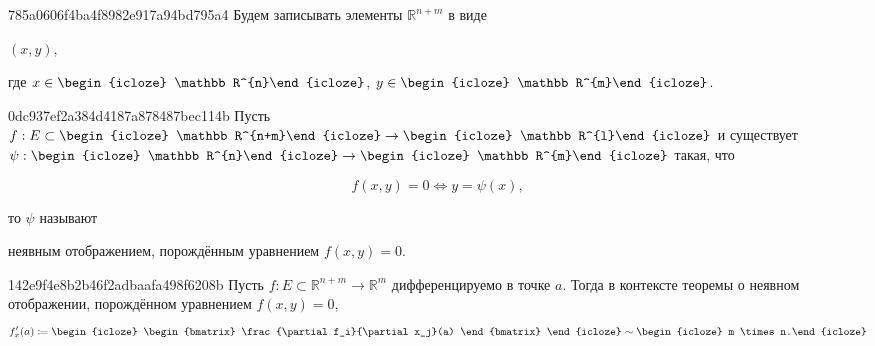 \begin{note}{785a0606f4ba4f8982e917a94bd795a4}
    Будем записывать элементы \({ \mathbb R^{n+m} }\) в виде \begin{icloze}{1}\({ (x, y) }\),\end{icloze} где \({ x \in \begin{icloze}{2}\mathbb R^{n}\end{icloze} }\), \({ y \in \begin{icloze}{2}\mathbb R^{m}\end{icloze} }\).
\end{note}

\begin{note}{0dc937ef2a384d4187a878487bec114b}
    Пусть \({ f : E \subset \begin{icloze}{4}\mathbb R^{n+m}\end{icloze} \to \begin{icloze}{4}\mathbb R^{l}\end{icloze} }\) и существует \({ \psi : \begin{icloze}{3}\mathbb R^{n}\end{icloze} \to \begin{icloze}{3}\mathbb R^{m}\end{icloze} }\) такая, что
    \begin{icloze}{2}
        \[
            f(x, y) = 0 \iff y = \psi(x),
        \]
    \end{icloze}
    то \({ \psi }\) называют \begin{icloze}{1}неявным отображением, порождённым уравнением \({ f(x, y) = 0 }\).\end{icloze}
\end{note}

\begin{note}{142e9f4e8b2b46f2adbaafa498f6208b}
    Пусть \({ f : E \subset \mathbb R^{n + m} \to \mathbb R^{m} }\) дифференцируемо в точке \({ a }\).
    Тогда в контексте теоремы о неявном отображении, порождённом уравнением \({ f(x, y) = 0 }\),
    \[
        f'_{x}(a) \coloneqq
        \begin{icloze}{1}
            \begin{bmatrix}
                \frac{\partial f_i}{\partial x_j}(a)
            \end{bmatrix}
        \end{icloze}
        \sim \begin{icloze}{2}m \times n.\end{icloze}
    \]
\end{note}

